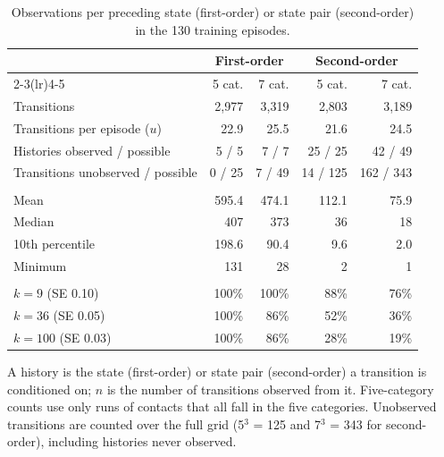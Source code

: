\begin{table}[htbp]
\centering
\small
\caption{Observations per preceding state (first-order) or state pair (second-order) in the 130 training episodes.}
\label{tab:s1_data}
\setlength{\tabcolsep}{4pt}
\begin{tabular*}{\linewidth}{@{\extracolsep{\fill}}lrrrr}
\toprule
 & \multicolumn{2}{c}{\textbf{First-order}} & \multicolumn{2}{c}{\textbf{Second-order}} \\
\cmidrule(lr){2-3}\cmidrule(lr){4-5}
 & 5 cat. & 7 cat. & 5 cat. & 7 cat. \\
\midrule
Transitions & 2,977 & 3,319 & 2,803 & 3,189 \\
Transitions per episode ($u$) & 22.9 & 25.5 & 21.6 & 24.5 \\
Histories observed / possible & 5 / 5 & 7 / 7 & 25 / 25 & 42 / 49 \\
Transitions unobserved / possible & 0 / 25 & 7 / 49 & 14 / 125 & 162 / 343 \\
\addlinespace
\multicolumn{5}{l}{\textit{Observations per observed history ($n$)}} \\
\quad Mean & 595.4 & 474.1 & 112.1 & 75.9 \\
\quad Median & 407 & 373 & 36 & 18 \\
\quad 10th percentile & 198.6 & 90.4 & 9.6 & 2.0 \\
\quad Minimum & 131 & 28 & 2 & 1 \\
\addlinespace
\multicolumn{5}{l}{\textit{Share of observed histories with $n \geq k$}} \\
\quad $k = 9$ (SE 0.10) & 100\% & 100\% & 88\% & 76\% \\
\quad $k = 36$ (SE 0.05) & 100\% & 86\% & 52\% & 36\% \\
\quad $k = 100$ (SE 0.03) & 100\% & 86\% & 28\% & 19\% \\
\bottomrule
\end{tabular*}
\par\smallskip
\begin{minipage}{\linewidth}\footnotesize
A history is the state (first-order) or state pair (second-order) a transition is conditioned on; $n$ is the number of transitions observed from it. Five-category counts use only runs of contacts that all fall in the five categories. Unobserved transitions are counted over the full grid (5$^3$ = 125 and 7$^3$ = 343 for second-order), including histories never observed.
\end{minipage}
\end{table}
